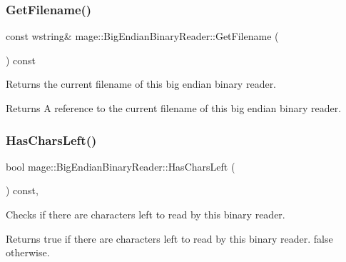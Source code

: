 \subsubsection{\texorpdfstring{Get\+Filename()}{GetFilename()}}
{\footnotesize\ttfamily const wstring\& mage\+::\+Big\+Endian\+Binary\+Reader\+::\+Get\+Filename (\begin{DoxyParamCaption}{ }\end{DoxyParamCaption}) const\hspace{0.3cm}{\ttfamily [noexcept]}}

Returns the current filename of this big endian binary reader.

\begin{DoxyReturn}{Returns}
A reference to the current filename of this big endian binary reader. 
\end{DoxyReturn}
\hypertarget{classmage_1_1_big_endian_binary_reader_adaa45913c50d4cb54456121ba56c8afb}{}\label{classmage_1_1_big_endian_binary_reader_adaa45913c50d4cb54456121ba56c8afb} 
\subsubsection{\texorpdfstring{Has\+Chars\+Left()}{HasCharsLeft()}}
{\footnotesize\ttfamily bool mage\+::\+Big\+Endian\+Binary\+Reader\+::\+Has\+Chars\+Left (\begin{DoxyParamCaption}{ }\end{DoxyParamCaption}) const\hspace{0.3cm}{\ttfamily [protected]}, {\ttfamily [noexcept]}}

Checks if there are characters left to read by this binary reader.

\begin{DoxyReturn}{Returns}
{\ttfamily true} if there are characters left to read by this binary reader. {\ttfamily false} otherwise. 
\end{DoxyReturn}
\hypertarget{classmage_1_1_big_endian_binary_reader_abd4b24df4219469a8c2e9253b1cad405}{}\label{classmage_1_1_big_endian_binary_reader_abd4b24df4219469a8c2e9253b1cad405} 

